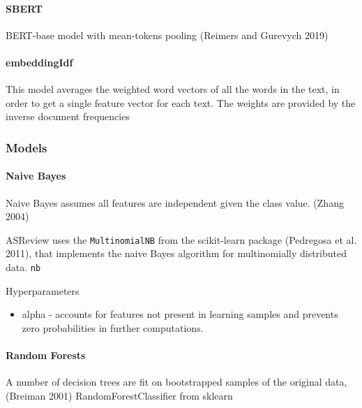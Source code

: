 \documentclass[
]{article}
\providecommand{\tightlist}{%
  \setlength{\itemsep}{0pt}\setlength{\parskip}{0pt}}
\begin{document}
\hypertarget{sbert}{%
\paragraph{SBERT}\label{sbert}}

BERT-base model with mean-tokens pooling (Reimers and Gurevych 2019)

\hypertarget{embeddingidf}{%
\paragraph{embeddingIdf}\label{embeddingidf}}

This model averages the weighted word vectors of all the words in the
text, in order to get a single feature vector for each text. The weights
are provided by the inverse document frequencies

\hypertarget{models-1}{%
\subsubsection{Models}\label{models-1}}

\hypertarget{naive-bayes}{%
\paragraph{Naive Bayes}\label{naive-bayes}}

Naive Bayes assumes all features are independent given the class value.
(Zhang 2004)

ASReview uses the \texttt{MultinomialNB} from the scikit-learn package
(Pedregosa et al. 2011), that implements the naive Bayes algorithm for
multinomially distributed data. \texttt{nb}

Hyperparameters

\begin{itemize}
\tightlist
\item
  alpha - accounts for features not present in learning samples and
  prevents zero probabilities in further computations.
\end{itemize}

\hypertarget{random-forests}{%
\paragraph{Random Forests}\label{random-forests}}

A number of decision trees are fit on bootstrapped samples of the
original data, (Breiman 2001) RandomForestClassifier from sklearn
\end{document}
